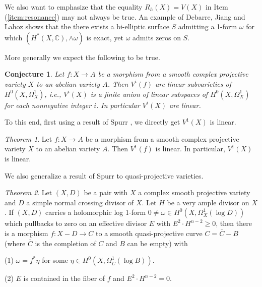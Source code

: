 \documentclass[a4paper,12pt,reqno]{amsart}
\theoremstyle{plain}
\newtheorem{conjecture}[theorem]{Conjecture}
\theoremstyle{definition}
\theoremstyle{remark}
\newtheorem{alphtheorem}{Theorem}
\begin{document}
We also want to emphasize that the equality $R_h(X) = V(X)$ in Item (\ref{item:resonance}) may not always be true. An example of Debarre, Jiang and Lahoz 
\cite[Example 1.11]{DJL17} shows that the
there exists a bi-elliptic surface $S$ admitting a 1-form 
$\omega$ for which $(H^*(X, \mathbb{C}), \wedge \omega)$
is exact, yet $\omega$ admits zeros on $S$. 

More generally we expect the following to be true.
\begin{conjecture} \label{linear-vi}
Let $f: X\to A$ be a morphism from a smooth complex projective variety $X$ to an abelian variety $A$. Then $V^i(f)$ are linear subvarieties of $H^0(X, \Omega_X^1)$, i.e., $V^i(X)$ is a finite union of linear subspaces of $H^0(X, \Omega_X^1)$ for each nonnegative integer $i$. In particular $V^i(X)$ are linear.
\end{conjecture}

To this end, first using a result of Spurr \cite{Sp88}, we directly get $V^1(X)$ is linear.

\begin{alphtheorem}
Let $f: X\to A$ be a morphism from a smooth complex projective variety $X$ to an abelian variety $A$. Then $V^1(f)$ is linear. In particular, $V^1(X)$ is linear.
\end{alphtheorem}


We also generalize a result of Spurr \cite{Sp88} to quasi-projective varieties. 

\begin{alphtheorem} \label{main3}
Let $(X, D)$ be a pair with $X$ a complex smooth projective variety and $D$ a simple normal crossing divisor of $X$. Let $H$ be a very ample divisor on $X$. If $(X, D)$ carries a holomorphic log 1-form $0\not=\omega\in H^0(X, \Omega_X^1(\log D))$  which pullbacks to zero on an effective divisor $E$ with $E^2\cdot H^{n-2}\geq0$, then there is a morphism $f: X-D\to C$ to a smooth quasi-projective curve $C=\bar{C}-B$ (where $\bar{C}$ is the completion of $C$ and $B$ can be empty) with 

(1)  $\omega=f^*\eta$ for some $\eta\in H^0(X, \Omega_{\bar{C}}^1(\log B))$.

(2) $E$ is contained in the fiber of $f$ and $E^2\cdot H^{n-2}=0$.
\end{alphtheorem}
\end{document}
